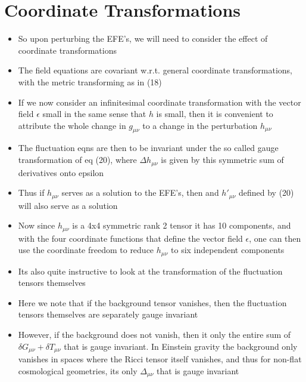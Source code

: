 \documentclass[10pt,letterpaper]{article}
\numberwithin{equation}{section}
\begin{document}
\section{Coordinate Transformations}
\begin{itemize}	
	\item So upon perturbing the EFE's, we will need to consider the effect of coordinate transformations
	\item The field equations are covariant w.r.t. general coordinate transformations, with the metric transforming as in (18)
	\item If we now consider an infinitesimal coordinate transformation with the vector field $\epsilon$ small in the same sense that $h$ is small, then it is convenient to attribute the whole change in $g_{\mu\nu}$ to a change in the perturbation $h_{\mu\nu}$ 
	\item The fluctuation eqns are then to be invariant under the so called gauge transformation of eq (20), where $\Delta h_{\mu\nu}$ is given by this symmetric sum of derivatives onto epsilon
	\item Thus if $h_{\mu\nu}$ serves as a solution to the EFE's, then and $h'_{\mu\nu}$ defined by (20) will also serve as a solution
	\item Now since $h_{\mu\nu}$ is a 4x4 symmetric rank 2 tensor it has 10 components, and with the four coordinate functions that define the vector field $\epsilon$, one can then use the coordinate freedom to reduce $h_{\mu\nu}$ to six independent components
	\item Its also quite instructive to look at the transformation of the fluctuation tensors themselves
	\item Here we note that if the background tensor vanishes, then the fluctuation tensors themselves are separately gauge invariant
	\item However, if the background does not vanish, then it only the entire sum of $\delta G_{\mu\nu} + \delta T_{\mu\nu}$ that is gauge invariant. In Einstein gravity the background only vanishes in spaces where the Ricci tensor itself vanishes, and thus for non-flat cosmological geometries, its only $\Delta_{\mu\nu}$ that is gauge invariant
\end{itemize}

\end{document}
